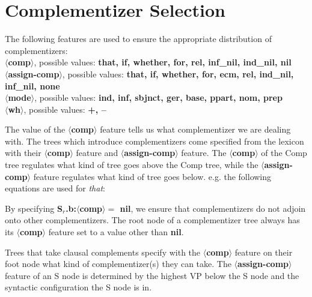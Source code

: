 



\section{Complementizer Selection}
The following features are used to ensure the appropriate distribution
of complementizers:
\\
{\bf $\langle$comp$\rangle$}, possible values: {\bf that, if, whether,
for, rel, inf\_nil, ind\_nil, nil}\\
{\bf $\langle$assign-comp$\rangle$}, possible values: {\bf that, if,
whether, for, ecm, rel, ind\_nil, inf\_nil, none}\\
{\bf $\langle$mode$\rangle$}, possible values: {\bf ind, inf, sbjnct, ger, base, ppart, 
nom, prep}\\
{\bf $\langle$wh$\rangle$}, possible values: {\bf +, --}

The value of the {\bf $\langle$comp$\rangle$} feature tells us what complementizer we 
are dealing with. The trees which introduce complementizers come 
specified from the lexicon with their 
{\bf $\langle$comp$\rangle$} feature and {\bf $\langle$assign-comp$\rangle$} 
feature. The {\bf $\langle$comp$\rangle$} of the Comp tree regulates 
what kind of tree goes above the Comp tree, while the 
{\bf $\langle$assign-comp$\rangle$} feature regulates what kind of tree
goes below.
e.g.
the following equations are used for {\em that}:


By specifying {\bf S$_{r}$.b:$\langle$comp$\rangle =$ nil}, we ensure that
complementizers do not adjoin onto other complementizers. The root node
of a complementizer tree always has its {\bf $\langle$comp$\rangle$} feature
set to a value other than {\bf nil}.

Trees that take clausal complements specify with the {\bf $\langle$comp$\rangle$} feature
on their foot node what kind of complementizer(s) they can take. 
The {\bf $\langle$assign-comp$\rangle$} feature of an S node is determined 
by the highest VP below the S node and the syntactic configuration
the S node is in. 


